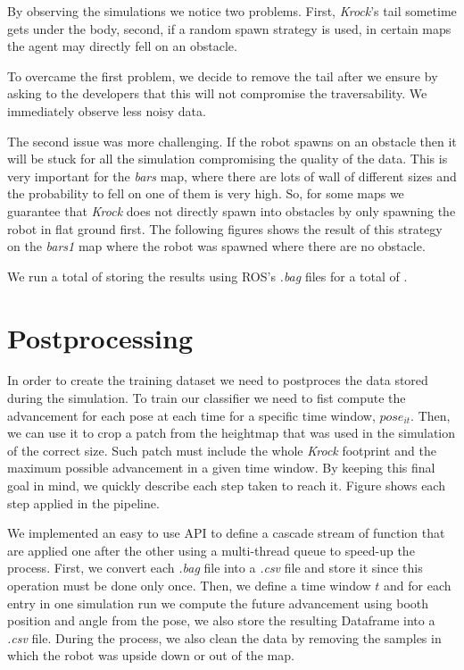 \documentclass[../document.tex]{subfiles}
\begin{document}

By observing the simulations we notice two problems. First, \emph{Krock}'s tail sometime gets under the body, second, if a random spawn strategy is used, in certain maps the agent may directly fell on an obstacle.

To overcame the first problem, we decide to remove the tail after we ensure by asking to the developers that this will not compromise the traversability. We immediately observe less noisy data. 


The second issue was more challenging. If the robot spawns on an obstacle then it will be stuck for all the simulation compromising the quality of the data. This is very important for the \emph{bars} map, where there are lots of wall of different sizes and the probability to fell on one of them is very high. So, for some maps  we guarantee that \emph{Krock} does not directly spawn into obstacles by only spawning the robot in flat ground first. The following figures shows the result of this strategy on the \emph{bars1} map where the robot was spawned where there are no obstacle.


We run a total of  storing the results using ROS's \emph{.bag} files for a total of .
\section{Postprocessing}
In order to create the training dataset we need to postproces the data stored during the simulation. To train our classifier we need to fist compute the advancement for each pose at each time for a specific time window, $pose_{it}$. Then, we can use it to crop a patch from the heightmap that was used in the simulation of the correct size. Such patch must include the whole \emph{Krock} footprint and the maximum possible advancement in a given time window. 
By keeping this final goal in mind, we quickly describe each step taken to reach it. Figure shows each step applied in the pipeline. 


We implemented an easy to use API  to define a cascade stream of function that are applied one after the other using a multi-thread queue to speed-up the process.
First, we convert each \emph{.bag} file into a \emph{.csv} file and store it since this operation must be done only once. Then, we define a time window $t$ and for each entry in one simulation run we compute the future advancement using booth position and angle from the pose, we also store the resulting Dataframe into a \emph{.csv} file. During the process, we also clean the data by removing the samples in which the robot was upside down or out of the map.
\end{document}
